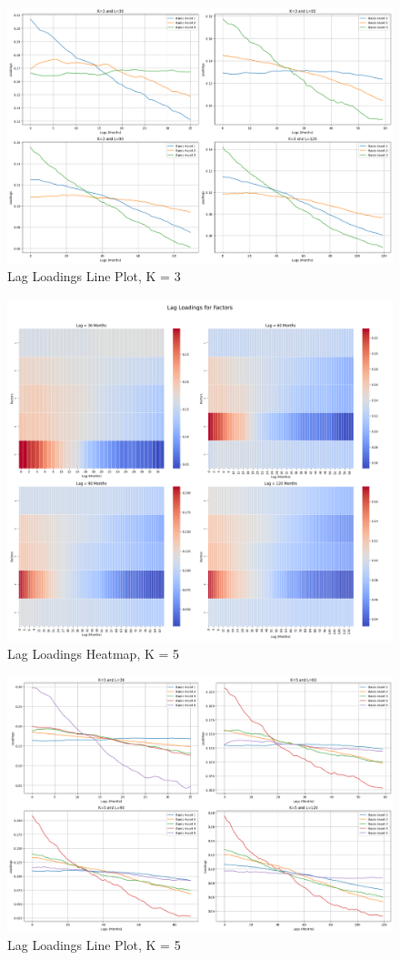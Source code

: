 \documentclass{article}
\begin{document}
\begin{figure}[H]
    \centering
    \includegraphics[width=0.85\linewidth]{W_3_line.png}
    \caption{Lag Loadings Line Plot, K = 3}
    \label{fig:W_3_line}
\end{figure}

\begin{figure}[H]
    \centering
    \includegraphics[width=0.85\linewidth]{W_5.png}
    \caption{Lag Loadings Heatmap, K = 5}
    \label{fig:W_5}
\end{figure}
\begin{figure}[H]
    \centering
    \includegraphics[width=0.85\linewidth]{W_5_line.png}
    \caption{Lag Loadings Line Plot, K = 5}
    \label{fig:W_5_line}
\end{figure}
\end{document}
